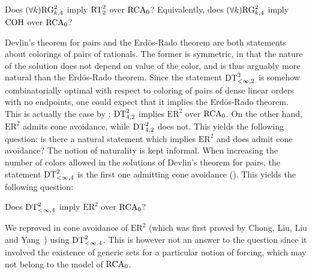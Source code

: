 \begin{question}
Does $(\forall k)\mathrm{RG}^2_{k, 4}$ imply $\mathrm{RT}^{2}_{2}$ over $\mathrm{RCA}_0$?
Equivalently, does $(\forall k)\mathrm{RG}^2_{k, 4}$ imply $\mathrm{COH}$ over $\mathrm{RCA}_0$?
\end{question}


Devlin's theorem for pairs and the Erd\"os-Rado theorem are both statements about colorings of pairs of rationals. The former is symmetric, in that the nature of the solution does not depend on value of the color, and is thus arguably more natural than the Erd\"os-Rado theorem.
Since the statement $\mathrm{DT}^{2}_{<\infty,2}$ is somehow combinatorially optimal with respect to coloring of pairs of  dense linear orders with no endpoints, one could expect that it implies the Erd\"os-Rado theorem. This is actually the case by : $\mathrm{DT}^{2}_{4,2}$ implies $\mathrm{ER}^2$ over $\mathrm{RCA}_0$. On the other hand, $\mathrm{ER}^2$ admits cone avoidance, while $\mathrm{DT}^{2}_{4,2}$ does not. This yields the following question: is there a natural statement which implies $\mathrm{ER}^2$ and does admit cone avoidance? The notion of naturality is kept informal. When increasing the number of colors allowed in the solutions of Devlin's theorem for pairs, the statement $\mathrm{DT}^{2}_{<\infty,4}$ is the first one admitting cone avoidance (). This yields the following question:

\begin{question}
Does $\mathrm{DT}^{2}_{<\infty,4}$ imply $\mathrm{ER}^2$ over $\mathrm{RCA}_0$?
\end{question}

We reproved in  cone avoidance of $\mathrm{ER}^2$ (which was first proved by Chong, Liu, Liu and Yang~\cite{Chong2019Strengthc}) using $\mathrm{DT}^{2}_{<\infty,4}$. This is however not an answer to the question since it involved the existence of generic sets for a particular notion of forcing, which may not belong to the model of $\mathrm{RCA}_0$.
